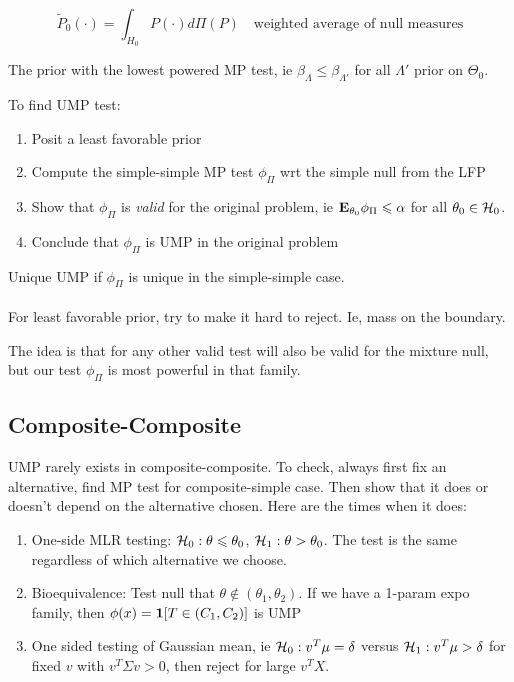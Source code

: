 \documentclass{article}
\begin{document}
$$\tilde P_0 (\cdot) = \int_{H_0} P(\cdot) d\Pi(P) \quad \text{weighted average of null measures}$$
\begin{definition}
The prior with the lowest powered MP test, ie $\beta_{\Lambda} \leq \beta_{\Lambda'}$ for all $\Lambda'$ prior on $\Theta_0$. 
\end{definition}

\begin{recipe}

To find UMP test:
\begin{enumerate}
	\item Posit a least favorable prior
	\item Compute the simple-simple MP test $\phi_\Pi$ wrt the simple null from the LFP
	\item Show that $\phi_\Pi$ is \textit{valid} for the original problem, ie $\mathbf{E}_{\theta_0} \phi_\Pi \leqslant \alpha$ for all $\theta_0 \in \mathcal H_0$.
	\item Conclude that $\phi_\Pi$ is UMP in the original problem
\end{enumerate}
Unique UMP if $\phi_\Pi$ is unique in the simple-simple case.\\\\
For least favorable prior, try to make it hard to reject. Ie, mass on the boundary. 
\end{recipe}

The idea is that for any other valid test will also be valid for the mixture null, but our test $\phi_\Pi$ is most powerful in that family. 
\subsection{Composite-Composite}
UMP rarely exists in composite-composite. To check, always first fix an alternative, find MP test for composite-simple case. Then show that it does or doesn't depend on the alternative chosen. Here are the times when it does:

\begin{enumerate}
	\item One-side MLR testing: $\mathcal H_0: \theta\leqslant \theta_0$, $\mathcal H_1: \theta>\theta_0$. The test is the same regardless of which alternative we choose. 
	\item Bioequivalence: Test null that $\theta \notin (\theta_1,\theta_2)$. If we have a 1-param expo family, then $\phi(x) = \boldsymbol{1}[T\in (C_1, C_2)]$ is UMP
	\item One sided testing of Gaussian mean, ie $\mathcal H_0: v^T \mu = \delta$ versus $\mathcal H_1: v^T \mu >\delta$ for fixed $v$ with $v^T \Sigma v>0$, then reject for large $v^T X$. 
\end{enumerate}
\end{document}
